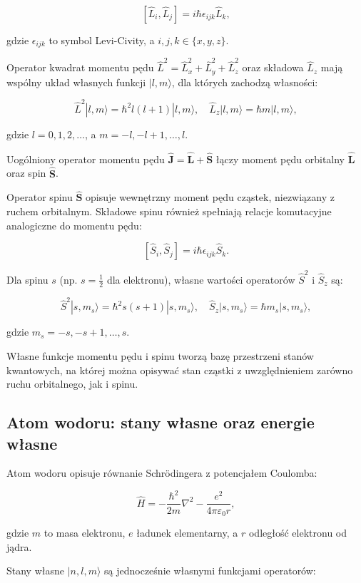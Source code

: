 \[
[\hat{L}_i, \hat{L}_j] = i \hbar \epsilon_{ijk} \hat{L}_k,
\]

gdzie \(\epsilon_{ijk}\) to symbol Levi-Civity, a \(i, j, k \in \{x,y,z\}\).

Operator kwadrat momentu pędu \(\hat{L}^2 = \hat{L}_x^2 + \hat{L}_y^2 + \hat{L}_z^2\) oraz składowa \(\hat{L}_z\) mają wspólny układ własnych funkcji \(|l, m\rangle\), dla których zachodzą własności:

\[
\hat{L}^2 |l, m\rangle = \hbar^2 l(l+1) |l, m\rangle, \quad \hat{L}_z |l, m\rangle = \hbar m |l, m\rangle,
\]

gdzie \(l = 0, 1, 2, \ldots\), a \(m = -l, -l+1, \ldots, l\).

Uogólniony operator momentu pędu \(\hat{\mathbf{J}} = \hat{\mathbf{L}} + \hat{\mathbf{S}}\) łączy moment pędu orbitalny \(\hat{\mathbf{L}}\) oraz spin \(\hat{\mathbf{S}}\).

Operator spinu \(\hat{\mathbf{S}}\) opisuje wewnętrzny moment pędu cząstek, niezwiązany z ruchem orbitalnym. Składowe spinu również spełniają relacje komutacyjne analogiczne do momentu pędu:

\[
[\hat{S}_i, \hat{S}_j] = i \hbar \epsilon_{ijk} \hat{S}_k.
\]

Dla spinu \(s\) (np. \(s = \frac{1}{2}\) dla elektronu), własne wartości operatorów \(\hat{S}^2\) i \(\hat{S}_z\) są:

\[
\hat{S}^2 |s, m_s\rangle = \hbar^2 s(s+1) |s, m_s\rangle, \quad \hat{S}_z |s, m_s\rangle = \hbar m_s |s, m_s\rangle,
\]

gdzie \(m_s = -s, -s+1, \ldots, s\).

Własne funkcje momentu pędu i spinu tworzą bazę przestrzeni stanów kwantowych, na której można opisywać stan cząstki z uwzględnieniem zarówno ruchu orbitalnego, jak i spinu.

\subsection{Atom wodoru: stany własne oraz energie własne}


Atom wodoru opisuje równanie Schrödingera z potencjałem Coulomba:

\[
\hat{H} = -\frac{\hbar^2}{2m} \nabla^2 - \frac{e^2}{4 \pi \varepsilon_0 r},
\]

gdzie \(m\) to masa elektronu, \(e\) ładunek elementarny, a \(r\) odległość elektronu od jądra.

Stany własne \(|n, l, m\rangle\) są jednocześnie własnymi funkcjami operatorów:

